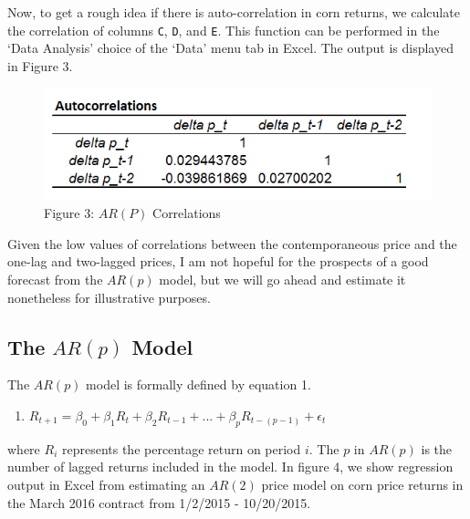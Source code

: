 \documentclass[
  letterpaper,
  DIV=11,
  numbers=noendperiod]{scrreprt}
\providecommand{\tightlist}{%
  \setlength{\itemsep}{0pt}\setlength{\parskip}{0pt}}\usepackage{longtable,booktabs,array}
\begin{document}
Now, to get a rough idea if there is auto-correlation in corn returns,
we calculate the correlation of columns \texttt{C}, \texttt{D}, and
\texttt{E}. This function can be performed in the `Data Analysis' choice
of the `Data' menu tab in Excel. The output is displayed in Figure 3.

\begin{figure}

{\centering \includegraphics{images/12_corn_autocorrel.png}

}

\caption{Figure 3: \(AR(P)\) Correlations}

\end{figure}

Given the low values of correlations between the contemporaneous price
and the one-lag and two-lagged prices, I am not hopeful for the
prospects of a good forecast from the \(AR(p)\) model, but we will go
ahead and estimate it nonetheless for illustrative purposes.

\hypertarget{the-arp-model}{%
\subsection{\texorpdfstring{The \(AR(p)\)
Model}{The AR(p) Model}}\label{the-arp-model}}

The \(AR(p)\) model is formally defined by equation 1.

\begin{enumerate}
\def\labelenumi{\arabic{enumi}.}
\tightlist
\item
  \(R_{t+1} = \beta_0 + \beta_1R_{t} + \beta_2R_{t-1}+ ... + \beta_{p}R_{t-(p-1)} + \epsilon_t\)
\end{enumerate}

where \(R_i\) represents the percentage return on period \(i\). The
\(p\) in \(AR(p)\) is the number of lagged returns included in the
model. In figure 4, we show regression output in Excel from estimating
an \(AR(2)\) price model on corn price returns in the March 2016
contract from 1/2/2015 - 10/20/2015.
\end{document}
